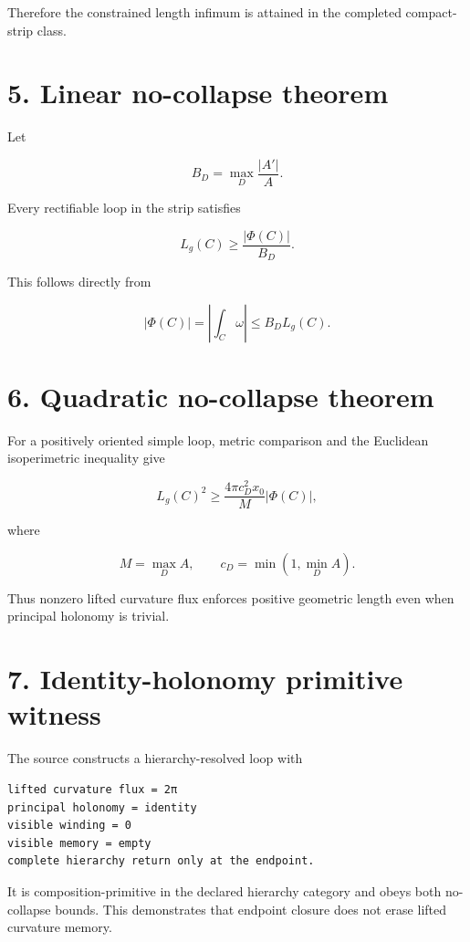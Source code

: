 Therefore the constrained length infimum is attained in the completed compact-strip class.

\hypertarget{linear-no-collapse-theorem}{%
\section{5. Linear no-collapse theorem}\label{linear-no-collapse-theorem}}

Let

\[
B_D=\max_D\frac{|A'|}{A}.
\]

Every rectifiable loop in the strip satisfies

\[
\boxed{L_g(C)\ge\frac{|\Phi(C)|}{B_D}.}
\]

This follows directly from

\[
|\Phi(C)|=\left|\int_C\omega\right|
\le B_D L_g(C).
\]

\hypertarget{quadratic-no-collapse-theorem}{%
\section{6. Quadratic no-collapse theorem}\label{quadratic-no-collapse-theorem}}

For a positively oriented simple loop, metric comparison and the Euclidean isoperimetric inequality give

\[
\boxed{
L_g(C)^2
\ge
\frac{4\pi c_D^2x_0}{M}|\Phi(C)|,
}
\]

where

\[
M=\max_D A,
\qquad
c_D=\min(1,\min_D A).
\]

Thus nonzero lifted curvature flux enforces positive geometric length even when principal holonomy is trivial.

\hypertarget{identity-holonomy-primitive-witness}{%
\section{7. Identity-holonomy primitive witness}\label{identity-holonomy-primitive-witness}}

The source constructs a hierarchy-resolved loop with

\begin{verbatim}
lifted curvature flux = 2π
principal holonomy = identity
visible winding = 0
visible memory = empty
complete hierarchy return only at the endpoint.
\end{verbatim}

It is composition-primitive in the declared hierarchy category and obeys both no-collapse bounds. This demonstrates that endpoint closure does not erase lifted curvature memory.

